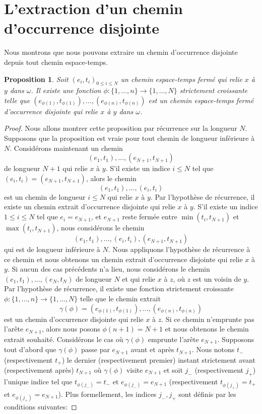 \documentclass[titlepage,a4paper,12pt]{article}
\newcounter{d}
\newcounter{t}
\newcounter{p}
\newcounter{c}
\newcounter{a}
\newcounter{l}
\newtheorem{prop}[p]{Proposition}
\begin{document}
\section{L'extraction d'un chemin d'occurrence disjointe}
Nous montrons que nous pouvons extraire un chemin d'occurrence disjointe depuis tout chemin espace-temps.
\begin{prop}
Soit $(e_i,t_i)_{0\leqslant i \leqslant N}$ un chemin espace-temps fermé qui relie $x$ à $y$ dans $\omega$. Il existe une fonction $\phi: \{1,\dots, n\}\rightarrow \{1,\dots, N\}$ strictement croissante telle que $(e_{\phi(1)},t_{\phi(1)}),\dots,(e_{\phi(n)},t_{\phi(n)})$ est un chemin espace-temps fermé d'occurrence disjointe qui relie $x$ à $y$ dans $\omega$.
\end{prop}
\begin{proof}
Nous allons montrer cette proposition par récurrence sur la longueur $N$. Supposons que la proposition est vraie pour tout chemin de longueur inférieure à $N$. Considérons maintenant un chemin $$(e_1,t_1),\dots, (e_{N+1},t_{N+1})$$ de longueur $N+1$ qui relie $x$ à $y$. S'il existe un indice $i\leqslant N$ tel que $(e_i,t_i) = (e_{N+1},t_{N+1})$, alors le chemin $$(e_1,t_1),\dots,(e_i,t_i)
$$ est un chemin de longueur $i\leqslant N$ qui relie $x$ à $y$. Par l'hypothèse de récurrence, il existe un chemin extrait d'occurrence disjointe qui relie $x$ à $y$. S'il existe un indice $1\leqslant i\leqslant N$ tel que $e_i = e_{N+1}$, et $e_{N+1}$ reste fermée entre $\min(t_i,t_{N+1})$ et $\max(t_i,t_{N+1})$, nous considérons le chemin $$(e_1,t_1), \dots, (e_{i},t_{i}), (e_{N+1},t_{N+1})$$ qui est de longueur inférieure à $N$. Nous appliquons l'hypothèse de récurrence à ce chemin et nous obtenons un chemin extrait d'occurrence disjointe qui relie $x$ à $y$. Si aucun des cas précédents n'a lieu, nous considérons le chemin $(e_1,t_1),\dots,(e_N,t_N)$ de longueur $N$ et qui relie $x$ à $z$, où $z$ est un voisin de $y$. Par l'hypothèse de récurrence, il existe une fonction strictement croissante $\phi:\{1,\dots,n\}\rightarrow \{1,\dots, N\}$ telle que le chemin extrait $$\gamma(\phi) = (e_{\phi(1)},t_{\phi(1)}),\dots,(e_{\phi(n)},t_{\phi(n)})$$ est un chemin d'occurrence disjointe qui relie $x$ à $z$. 
Si ce chemin n'emprunte pas l'arête $e_{N+1}$, alors nous posons $\phi(n+1) = N+1$ et nous obtenons le chemin extrait souhaité.
Considérons le cas où $\gamma(\phi)$ emprunte l'arête $e_{N+1}$. Supposons tout d'abord que $\gamma(\phi)$ passe par $e_{N+1}$ avant et après $t_{N+1}$. Nous notons $t_-$ (respectivement $t_+$) le dernier (respectivement premier) instant strictement avant (respectivement après) $t_{N+1}$ où $\gamma(\phi)$ visite $e_{N+1}$ et soit $j_-$ (respectivement $j_+$) l'unique indice tel que $t_{\phi(j_-)}= t_-$ et $e_{\phi(j_-)}= e_{N+1}$ (respectivement $t_{\phi(j_+)}= t_+$ et $e_{\phi(j_+)}= e_{N+1}$). Plus formellement, les indices $j_-,j_+$ sont définis par les conditions suivantes:

\end{proof}
\end{document}
